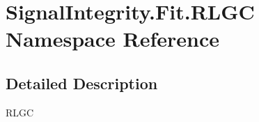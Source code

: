 \hypertarget{namespaceSignalIntegrity_1_1Fit_1_1RLGC}{}\section{Signal\+Integrity.\+Fit.\+R\+L\+GC Namespace Reference}
\label{namespaceSignalIntegrity_1_1Fit_1_1RLGC}


\subsection{Detailed Description}
\begin{DoxyVerb}RLGC\end{DoxyVerb}
 